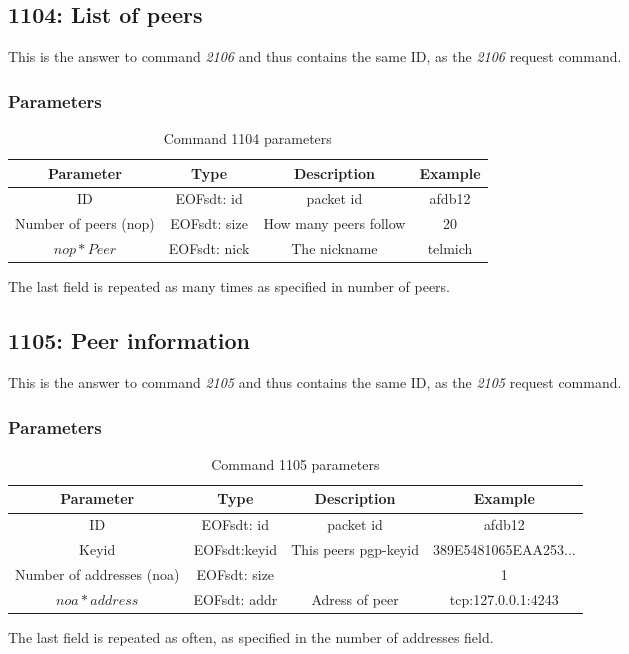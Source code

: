 \subsection{1104: List of peers}
This is the answer to command \emph{2106} and thus contains the
same ID, as the \emph{2106} request command.
\subsubsection{Parameters}
\begin{longtable}{|c|c|c|c|}
\caption{Command 1104 parameters}\\
\hline
\textbf{Parameter} & \textbf{Type} & \textbf{Description} & \textbf{Example}\\
\hline
ID & EOFsdt: id & packet id & afdb12\\
\hline
Number of peers (nop) & EOFsdt: size & How many peers follow & 20\\
\hline
$nop * Peer$ & EOFsdt: nick & The nickname & telmich\\
\hline
\end{longtable}
The last field is repeated as many times as specified in number of peers.
\subsection{1105: Peer information}
This is the answer to command \emph{2105} and thus contains the
same ID, as the \emph{2105} request command.
\subsubsection{Parameters}
\begin{longtable}{|c|c|c|c|}
\caption{Command 1105 parameters}\\
\hline
\textbf{Parameter} & \textbf{Type} & \textbf{Description} & \textbf{Example}\\
\hline
ID & EOFsdt: id & packet id & afdb12\\
\hline
Keyid & EOFsdt:keyid & This peers pgp-keyid & 389E5481065EAA253...\\
\hline
Number of addresses (noa) & EOFsdt: size & & 1\\
\hline
$noa * address$ & EOFsdt: addr & Adress of peer & tcp:127.0.0.1:4243\\
\hline
\end{longtable}
The last field is repeated as often, as specified in the number of addresses
field.
